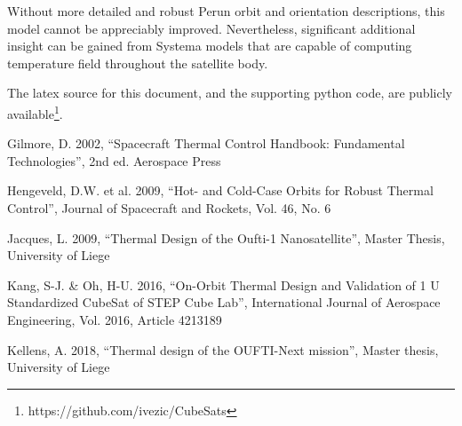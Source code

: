 \documentclass[]{aastex62}
\begin{document}
Without more detailed and robust Perun orbit and orientation descriptions, this model cannot
be appreciably improved. Nevertheless, significant additional insight can be gained from Systema
models that are capable of computing temperature field throughout the satellite body. 
 
The latex source for this document, and the supporting python code, are publicly 
available\footnote{https://github.com/ivezic/CubeSats}. 

\vskip 0.2in 
Gilmore, D. 2002, ``Spacecraft Thermal Control Handbook: Fundamental Technologies'', 2nd ed. Aerospace Press 

Hengeveld, D.W. et al. 2009, ``Hot- and Cold-Case Orbits for Robust Thermal Control'', Journal of Spacecraft and 
     \phantom{xxxxxx} Rockets,  Vol. 46, No. 6 

Jacques, L. 2009, ``Thermal Design of the Oufti-1 Nanosatellite'', Master Thesis, University of Liege

Kang, S-J. \& Oh, H-U. 2016, ``On-Orbit Thermal Design and Validation of 1 U Standardized CubeSat of STEP 
\phantom{xxxxxx}  Cube Lab'', 
        International Journal of Aerospace Engineering, Vol. 2016, Article 4213189

Kellens, A. 2018, ``Thermal design of the OUFTI-Next mission'', Master thesis, University of Liege
\end{document}
